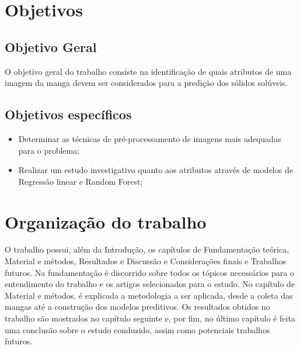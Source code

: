\section{Objetivos}

\subsection{Objetivo Geral}
O objetivo geral do trabalho consiste na identificação de quais atributos de uma imagem da manga devem ser considerados para a predição dos sólidos solúveis. 

\subsection{Objetivos específicos}

\begin{itemize}
	\item Determinar as técnicas de pré-processamento de imagens mais adequadas para o problema;
    \item Realizar um estudo investigativo quanto aos atributos através de modelos de Regressão linear e Random Forest;
\end{itemize}

\section{Organização do trabalho}

O trabalho possui, além da Introdução, os capítulos de Fundamentação teórica, Material e métodos, Resultados e Discussão e Considerações finais e Trabalhos futuros. Na fundamentação é discorrido sobre todos os tópicos necessários para o entendimento do trabalho e os artigos selecionados para o estudo. No capítulo de Material e métodos, é explicada a metodologia a ser aplicada, desde a coleta das mangas até a construção dos modelos preditivos. Os resultados obtidos no trabalho são mostrados no capítulo seguinte e, por fim, no último capítulo é feita uma conclusão sobre o estudo conduzido, assim como potenciais trabalhos futuros.
